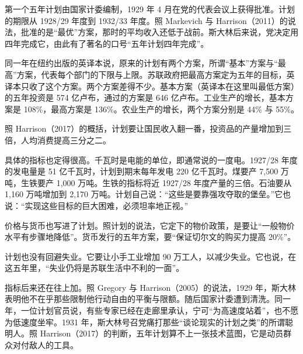 第一个五年计划由国家计委编制，1929 年 4 月在党的代表会议上获得批准\cite{harrison2017}。计划的期限从 1928/29 年度到 1932/33 年度\cite{gosplan1929}。照 Markevich 与 Harrison（2011）的说法，批准的是“最优”方案，那时的平均收入还低于战前\cite{markevich2011}。斯大林后来说，党决定用四年完成它，由此有了著名的口号“五年计划四年完成”\cite{stalin1933}。

同一年在纽约出版的英译本说，原来的计划有两个方案，所谓“基本”方案与“最高”方案，代表每个部门的下限与上限\cite{gosplan1929}。苏联政府把最高方案定为五年的目标，英译本只收了这个方案\cite{gosplan1929}。两个方案差得不少。基本方案（英译本在这里叫最低方案）的五年投资是 574 亿卢布，通过的方案是 646 亿卢布\cite{gosplan1929}。工业生产的增长，基本方案是 108\%，最高方案是 136\%\cite{gosplan1929}。农业生产的增长，两个方案分别是 44\% 与 55\%\cite{gosplan1929}。

照 Harrison（2017）的概括，计划要让国民收入翻一番，投资品的产量增加到三倍，人均消费提高三分之二\cite{harrison2017}。

具体的指标也定得很高。千瓦时是电能的单位，即通常说的一度电。1927/28 年度的发电量是 51 亿千瓦时，计划到期末每年发电 220 亿千瓦时\cite{gosplan1929}。煤要产 7,500 万吨，生铁要产 1,000 万吨\cite{gosplan1929}。生铁的指标将近 1927/28 年度产量的三倍\cite{gosplan1929}。石油要从 1,160 万吨增加到 2,170 万吨\cite{gosplan1929}。计划自己说：“这些是要靠强攻夺取的堡垒。”\cite{gosplan1929}它也说：“实现这些目标的巨大困难，必须坦率地正视。”\cite{gosplan1929}

价格与货币也写进了计划。照计划的说法，它定下的物价政策，是要让“一般物价水平有步骤地降低”\cite{gosplan1929}。货币发行的五年方案，要“保证切尔文的购买力提高 20\%”\cite{gosplan1929}。

计划也没有回避失业。它要让小手工业增加 90 万工人，以减少失业\cite{gosplan1929}。它也说，在这五年里，“失业仍将是苏联生活中不利的一面”\cite{gosplan1929}。

指标后来还在往上加。照 Gregory 与 Harrison（2005）的说法，1929 年，斯大林表明他不在乎那些限制他行动自由的平衡与限额\cite{gregory2005}。随后国家计委遭到清洗。同一年，一位计划官员说，有些专家已经在走廊里承认，宁可“为高速度站着”，也不愿为低速度坐牢\cite{gregory2005}。1931 年，斯大林号召党痛打那些“谈论现实的计划之类”的所谓聪明人\cite{harrison2017}。照 Harrison（2017）的判断，五年计划算不上一张技术蓝图，它是动员群众对付敌人的工具\cite{harrison2017}。

